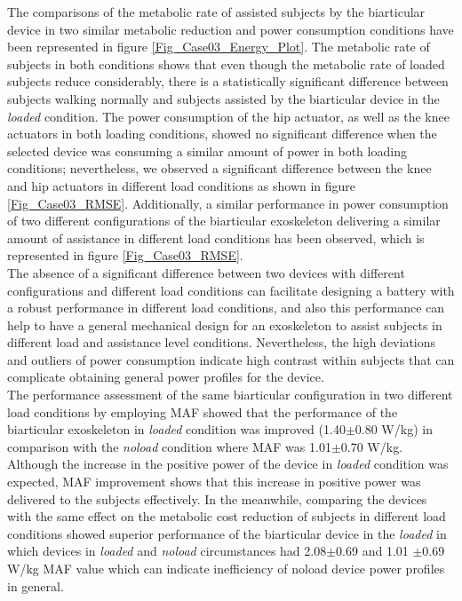 \documentclass[10pt,letterpaper]{article}
\begin{document}
The comparisons of the metabolic rate of assisted subjects by the biarticular device in two similar metabolic reduction and power consumption conditions have been represented in figure \ref{Fig_Case03_Energy_Plot}. The metabolic rate of subjects in both conditions shows that even though the metabolic rate of loaded subjects reduce considerably, there is a statistically significant difference between subjects walking normally and subjects assisted by the biarticular device in the {\it loaded} condition. The power consumption of the hip actuator, as well as the knee actuators in both loading conditions, showed no significant difference when the selected device was consuming a similar amount of power in both loading conditions; nevertheless, we observed a significant difference between the knee and hip actuators in different load conditions as shown in figure \ref{Fig_Case03_RMSE}. Additionally, a similar performance in power consumption of  two different configurations of the biarticular exoskeleton delivering a similar amount of assistance in different load conditions has been observed, which is represented in figure \ref{Fig_Case03_RMSE}.\\
The absence of a significant difference between two devices with different configurations and different load conditions can facilitate designing a battery with a robust performance in different load conditions, and also this performance can help to have a general mechanical design for an exoskeleton to assist subjects in different load and assistance level conditions. Nevertheless, the high deviations and outliers of power consumption indicate high contrast within subjects that can complicate obtaining general power profiles for the device.\\
The performance assessment of the same biarticular configuration in two different load conditions by employing MAF showed that the performance of the biarticular exoskeleton in {\it loaded} condition was improved (1.40$\pm$0.80 W/kg) in comparison with the  {\it noload} condition where MAF was 1.01$\pm$0.70 W/kg. Although the increase in the positive power of the device in {\it loaded} condition was expected, MAF improvement shows that this increase in positive power was delivered to the subjects effectively. In the meanwhile, comparing the devices with the same effect on the metabolic cost reduction of subjects in different load conditions showed superior performance of the biarticular device in the {\it loaded} in which devices in {\it loaded} and {\it noload} circumstances had  2.08$\pm$0.69 and 1.01 $\pm$0.69 W/kg MAF value which can indicate inefficiency of noload device power profiles in general.\\
\end{document}
